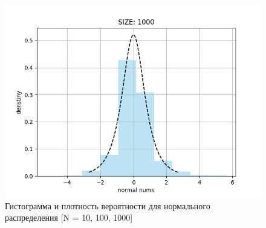 \begin{itemize}
\begin{figure}[H]
\begin{center}
			\includegraphics[scale=0.333]{resources/normal1000.png}
			\caption{Гистограмма и плотность вероятности для нормального распределения [N = 10, 100, 1000]} 
		\end{center}
	\end{figure}
	

\end{itemize}
